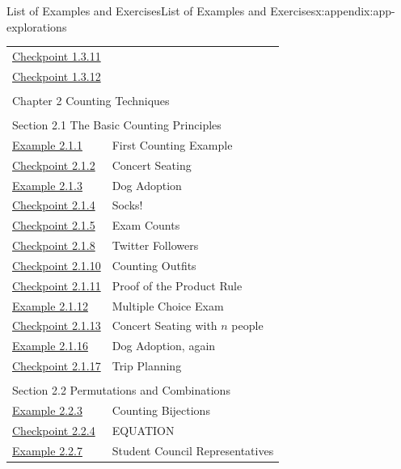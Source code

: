 \documentclass[oneside,10pt,]{book}
\numberwithin{equation}{section}
\begin{document}
\begin{appendixptx}{List of Examples and Exercises}{}{List of Examples and Exercises}{}{}{x:appendix:app-explorations}
\begin{longtable}[l]{ll}
\hyperref[x:exercise:ex-review-euclid-proof]{Checkpoint 1.3.11}& \\
\hyperref[x:exercise:ex-review-bezout-euclid]{Checkpoint 1.3.12}& \\
\multicolumn{2}{l}{\null}\\[1.5ex] \multicolumn{2}{l}{\large Chapter 2 Counting Techniques}\\[0.5ex]
\multicolumn{2}{l}{\null}\\[1.5ex] \multicolumn{2}{l}{\large Section 2.1 The Basic Counting Principles}\\[0.5ex]
\hyperref[x:example:eg-counting-writing-project]{Example 2.1.1}& First Counting Example\\
\hyperref[x:exercise:ex-counting-coldplay]{Checkpoint 2.1.2}& Concert Seating\\
\hyperref[x:example:eg-counting-dogs]{Example 2.1.3}& Dog Adoption\\
\hyperref[x:exercise:ex-counting-socks]{Checkpoint 2.1.4}& Socks!\\
\hyperref[x:exercise:ex-counting-test-papers]{Checkpoint 2.1.5}& Exam Counts\\
\hyperref[x:exercise:ex-counting-twitter]{Checkpoint 2.1.8}& Twitter Followers\\
\hyperref[x:exercise:ex-counting-outfit]{Checkpoint 2.1.10}& Counting Outfits\\
\hyperref[x:exercise:ex-counting-prove-product]{Checkpoint 2.1.11}& Proof of the Product Rule\\
\hyperref[x:example:eg-counting-mcq]{Example 2.1.12}& Multiple Choice Exam\\
\hyperref[x:exercise:ex-counting-coldplay2]{Checkpoint 2.1.13}& Concert Seating with \(n\) people\\
\hyperref[x:example:eg-counting-dogs-again]{Example 2.1.16}& Dog Adoption, again\\
\hyperref[x:exercise:ex-counting-party-leaders]{Checkpoint 2.1.17}& Trip Planning\\
\multicolumn{2}{l}{\null}\\[1.5ex] \multicolumn{2}{l}{\large Section 2.2 Permutations and Combinations}\\[0.5ex]
\hyperref[x:example:eg-counting-bijections]{Example 2.2.3}& Counting Bijections\\
\hyperref[x:exercise:ex-counting-EQUATION]{Checkpoint 2.2.4}& EQUATION\\
\hyperref[x:example:eg-counting-student-council]{Example 2.2.7}& Student Council Representatives\\

\end{longtable}
\end{appendixptx}
\end{document}
